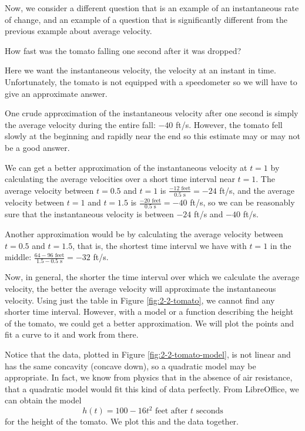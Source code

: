 Now, we consider a different question that is an example of an instantaneous rate of change, and an example of a question that is significantly different from the previous example about average velocity.
\begin{example}
    How fast was the tomato falling one second after it was dropped?

    \begin{solution}
    Here we want the instantaneous velocity, the velocity at an instant in time. Unfortunately, the tomato is not equipped with a speedometer so we will have to give an approximate answer.

    One crude approximation of the instantaneous velocity after one second is simply the average velocity during the entire fall: $-40$ ft/s. However, the tomato fell slowly at the beginning and rapidly near the end so this estimate may or may not be a good answer.

    We can get a better approximation of the instantaneous velocity at $t=1$ by calculating the average velocities over a short time interval near $t=1$. The average velocity between $t=0.5$ and $t=1$ is $\displaystyle\frac{-12 \mbox{ feet}}{0.5 \mbox{ s}} = -24$ ft/s, and the average velocity between $t=1$ and $t=1.5$ is $\displaystyle\frac{-20 \mbox{ feet}}{0.5 \mbox{ s}} = -40$ ft/s, so we can be reasonably sure that the instantaneous velocity is between $-24$ ft/s and $-40$ ft/s.

    Another approximation would be by calculating the average velocity between $t=0.5$ and $t=1.5$, that is, the shortest time interval we have with $t=1$ in the middle: $\displaystyle\frac{64-96 \mbox{ feet}}{1.5-0.5 \mbox{ s}} = -32$ ft/s.

     Now, in general, the shorter the time interval over which we calculate the average velocity, the better the average velocity will approximate the instantaneous velocity. Using just the table in Figure \ref{fig:2-2-tomato}, we cannot find any shorter time interval. However, with a model or a function describing the height of the tomato, we could get a better approximation. We will plot the points and fit a curve to it and work from there.

    Notice that the data, plotted in Figure \ref{fig:2-2-tomato-model}, is not linear and has the same concavity (concave down), so a quadratic model may be appropriate. In fact, we know from physics that in the absence of air resistance, that a quadratic model would fit this kind of data perfectly. From LibreOffice, we can obtain the model
$$h(t) = 100 - 16t^2 \mbox{ feet after } t \mbox{ seconds}$$
for the height of the tomato. We plot this and the data together.


\end{solution}
\end{example}
